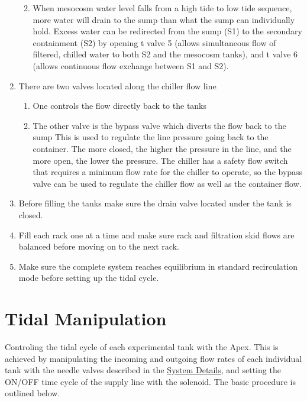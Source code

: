 \documentclass[]{book}
\providecommand{\tightlist}{%
  \setlength{\itemsep}{0pt}\setlength{\parskip}{0pt}}
\begin{document}
\begin{enumerate}
  \begin{enumerate}
  \def\labelenumii{\arabic{enumii}.}
  \tightlist
  \item
    When mesocosm water level falls from a high tide to low tide
    sequence, more water will drain to the sump than what the sump can
    individually hold. Excess water can be redirected from the sump (S1)
    to the secondary containment (S2) by opening t valve 5 (allows
    simultaneous flow of filtered, chilled water to both S2 and the
    mesocosm tanks), and t valve 6 (allows continuous flow exchange
    between S1 and S2).
  \end{enumerate}
\item
  There are two valves located along the chiller flow line

  \begin{enumerate}
  \def\labelenumii{\arabic{enumii}.}
  \tightlist
  \item
    One controls the flow directly back to the tanks\\
  \item
    The other valve is the bypass valve which diverts the flow back to
    the sump This is used to regulate the line pressure going back to
    the container. The more closed, the higher the pressure in the line,
    and the more open, the lower the pressure. The chiller has a safety
    flow switch that requires a minimum flow rate for the chiller to
    operate, so the bypass valve can be used to regulate the chiller
    flow as well as the container flow.\\
  \end{enumerate}
\item
  Before filling the tanks make sure the drain valve located under the
  tank is closed.
\item
  Fill each rack one at a time and make sure rack and filtration skid
  flows are balanced before moving on to the next rack.
\item
  Make sure the complete system reaches equilibrium in standard
  recirculation mode before setting up the tidal cycle.
\end{enumerate}

\chapter{Tidal Manipulation}\label{tidal-manipulation}

Controling the tidal cycle of each experimental tank with the Apex. This
is achieved by manipulating the incoming and outgoing flow rates of each
individual tank with the needle valves described in the
\protect\hyperlink{system-details}{System Details}, and setting the
ON/OFF time cycle of the supply line with the solenoid. The basic
procedure is outlined below.
\end{document}
